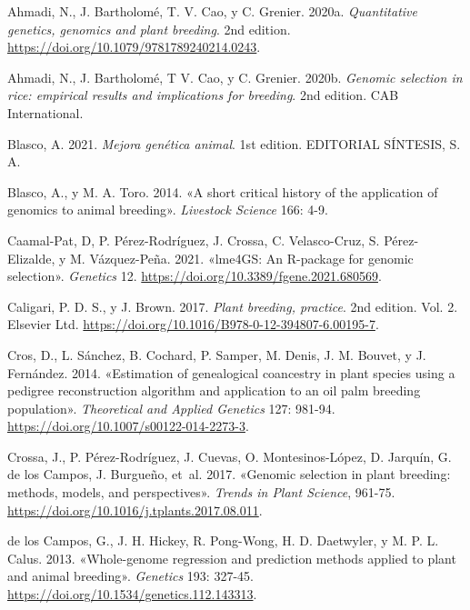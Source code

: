 \documentclass[11pt,spanish,a4paper,oneside,]{book} %
\begin{document}
\hypertarget{refs}{}
\leavevmode\hypertarget{ref-cite:33}{}%
Ahmadi, N., J. Bartholomé, T. V. Cao, y C. Grenier. 2020a. \emph{Quantitative genetics, genomics and plant breeding}. 2nd edition. \url{https://doi.org/10.1079/9781789240214.0243}.

\leavevmode\hypertarget{ref-cite:45}{}%
Ahmadi, N., J. Bartholomé, T V. Cao, y C. Grenier. 2020b. \emph{Genomic selection in rice: empirical results and implications for breeding}. 2nd edition. CAB International.

\leavevmode\hypertarget{ref-cite:21}{}%
Blasco, A. 2021. \emph{Mejora genética animal}. 1st edition. EDITORIAL SÍNTESIS, S. A.

\leavevmode\hypertarget{ref-cite:3}{}%
Blasco, A., y M. A. Toro. 2014. «A short critical history of the application of genomics to animal breeding». \emph{Livestock Science} 166: 4-9.

\leavevmode\hypertarget{ref-cite:51}{}%
Caamal-Pat, D, P. Pérez-Rodríguez, J. Crossa, C. Velasco-Cruz, S. Pérez-Elizalde, y M. Vázquez-Peña. 2021. «lme4GS: An R-package for genomic selection». \emph{Genetics} 12. \url{https://doi.org/10.3389/fgene.2021.680569}.

\leavevmode\hypertarget{ref-cite:42}{}%
Caligari, P. D. S., y J. Brown. 2017. \emph{Plant breeding, practice}. 2nd edition. Vol. 2. Elsevier Ltd. \url{https://doi.org/10.1016/B978-0-12-394807-6.00195-7}.

\leavevmode\hypertarget{ref-cite:48}{}%
Cros, D., L. Sánchez, B. Cochard, P. Samper, M. Denis, J. M. Bouvet, y J. Fernández. 2014. «Estimation of genealogical coancestry in plant species using a pedigree reconstruction algorithm and application to an oil palm breeding population». \emph{Theoretical and Applied Genetics} 127: 981-94. \url{https://doi.org/10.1007/s00122-014-2273-3}.

\leavevmode\hypertarget{ref-cite:37}{}%
Crossa, J., P. Pérez-Rodríguez, J. Cuevas, O. Montesinos-López, D. Jarquín, G. de los Campos, J. Burgueño, et~al. 2017. «Genomic selection in plant breeding: methods, models, and perspectives». \emph{Trends in Plant Science}, 961-75. \url{https://doi.org/10.1016/j.tplants.2017.08.011}.

\leavevmode\hypertarget{ref-cite:31}{}%
de los Campos, G., J. H. Hickey, R. Pong-Wong, H. D. Daetwyler, y M. P. L. Calus. 2013. «Whole-genome regression and prediction methods applied to plant and animal breeding». \emph{Genetics} 193: 327-45. \url{https://doi.org/10.1534/genetics.112.143313}.
\end{document}
